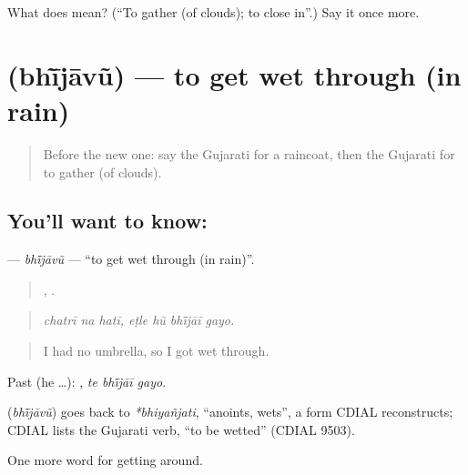 \begin{tcolorbox}[breakable,colback=teal!4,colframe=teal!35!black,title={Before you move on}]
What does  mean? (\textquotedblleft{}To gather (of clouds); to close in\textquotedblright{}.) Say it once more.
\end{tcolorbox}
\section[\texorpdfstring{\gu{ભીંજાવું} (bhī̃jāvũ)}{ભીંજાવું (bhī̃jāvũ)}]{ (bhī̃jāvũ) — to get wet through (in rain)}

\label{lesson:GU-C434-bhijavu}



\begin{quote}
Before the new one: say the Gujarati for a raincoat, then the Gujarati for to gather (of clouds).
\end{quote}

\subsection*{You'll want to know: }
\textbf{} — \emph{bhī̃jāvũ} — \textquotedblleft{}to get wet through (in rain)\textquotedblright{}.

\begin{quote}
  ,    .
\end{quote}

\begin{quote}
\emph{chatrī na hatī, eṭle hũ bhī̃jāī gayo.}
\end{quote}

\begin{quote}
I had no umbrella, so I got wet through.
\end{quote}

Past (he …):   , \emph{te bhī̃jāī gayo}.

\begin{cousinweb}
\textbf{} (\emph{bhī̃jāvũ}) goes back to \emph{*bhiyañjati}, \textquotedblleft{}anoints, wets\textquotedblright{}, a form CDIAL reconstructs; CDIAL lists the Gujarati verb, \textquotedblleft{}to be wetted\textquotedblright{} (CDIAL 9503).
\end{cousinweb}

\begin{grammarlens}[title={What you've built}]
One more word for getting around.
\end{grammarlens}

